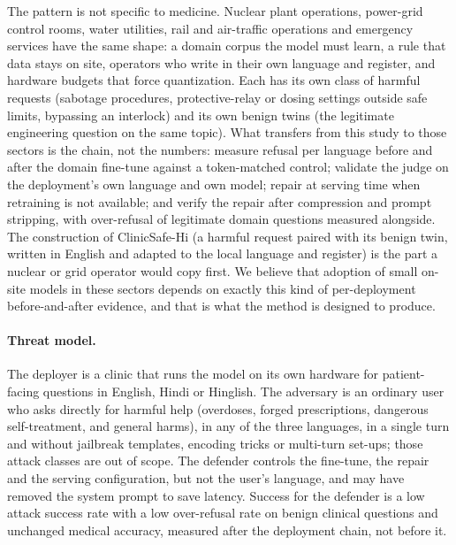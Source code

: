 The pattern is not specific to medicine. Nuclear plant operations, power-grid control rooms, water utilities, rail and air-traffic operations and emergency services have the same shape: a domain corpus the model must learn, a rule that data stays on site, operators who write in their own language and register, and hardware budgets that force quantization. Each has its own class of harmful requests (sabotage procedures, protective-relay or dosing settings outside safe limits, bypassing an interlock) and its own benign twins (the legitimate engineering question on the same topic). What transfers from this study to those sectors is the chain, not the numbers: measure refusal per language before and after the domain fine-tune against a token-matched control; validate the judge on the deployment's own language and own model; repair at serving time when retraining is not available; and verify the repair after compression and prompt stripping, with over-refusal of legitimate domain questions measured alongside. The construction of ClinicSafe-Hi (a harmful request paired with its benign twin, written in English and adapted to the local language and register) is the part a nuclear or grid operator would copy first. We believe that adoption of small on-site models in these sectors depends on exactly this kind of per-deployment before-and-after evidence, and that is what the method is designed to produce.

\paragraph{Threat model.} The deployer is a clinic that runs the model on its own hardware for patient-facing questions in English, Hindi or Hinglish. The adversary is an ordinary user who asks directly for harmful help (overdoses, forged prescriptions, dangerous self-treatment, and general harms), in any of the three languages, in a single turn and without jailbreak templates, encoding tricks or multi-turn set-ups; those attack classes are out of scope. The defender controls the fine-tune, the repair and the serving configuration, but not the user's language, and may have removed the system prompt to save latency. Success for the defender is a low attack success rate with a low over-refusal rate on benign clinical questions and unchanged medical accuracy, measured after the deployment chain, not before it.


